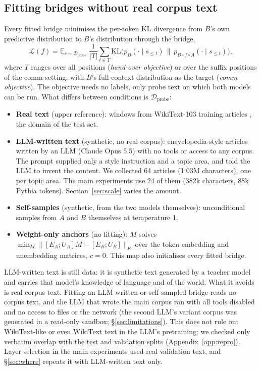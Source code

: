 \subsection{Fitting bridges without real corpus text}
Every fitted bridge minimises the per-token KL divergence from $B$'s own predictive distribution to $B$'s distribution through the bridge,
\begin{equation}
\mathcal{L}(f) = \mathbb{E}_{s\sim\mathcal{D}_{\text{probe}}}\;\frac{1}{|T|}\sum_{t\in T}\mathrm{KL}\big(p_B(\cdot\mid s_{\le t})\,\big\|\,p_{B\circ f\circ A}(\cdot\mid s_{\le t})\big),
\end{equation}
where $T$ ranges over all positions (\emph{hand-over objective}) or over the suffix positions of the comm setting, with $B$'s full-context distribution as the target (\emph{comm objective}). The objective needs no labels, only probe text on which both models can be run. What differs between conditions is $\mathcal{D}_{\text{probe}}$:
\begin{itemize}
\item \textbf{Real text} (upper reference): windows from WikiText-103 training articles \citep{merity2016wikitext}, the domain of the test set.
\item \textbf{LLM-written text} (synthetic, no real corpus): encyclopedia-style articles written by an LLM (Claude Opus 5.5) with no tools or access to any corpus. The prompt supplied only a style instruction and a topic area, and told the LLM to invent the content. We collected 64 articles (1.03M characters), one per topic area. The main experiments use 24 of them (382k characters, 88k Pythia tokens). Section~\ref{sec:scale} varies the amount.
\item \textbf{Self-samples} (synthetic, from the two models themselves): unconditional samples from $A$ and $B$ themselves at temperature 1.
\item \textbf{Weight-only anchors} (no fitting): $M$ solves $\min_M \lVert [E_A;U_A]M - [E_B;U_B]\rVert_F$ over the token embedding and unembedding matrices, $c=0$. This map also initialises every fitted bridge.
\end{itemize}
LLM-written text is still data: it is synthetic text generated by a teacher model and carries that model's knowledge of language and of the world. What it avoids is real corpus text. Fitting an LLM-written or self-sampled bridge reads no corpus text, and the LLM that wrote the main corpus ran with all tools disabled and no access to files or the network (the second LLM's variant corpus was generated in a read-only sandbox; \S\ref{sec:limitations}). This does not rule out WikiText-like or even WikiText text in the LLM's pretraining; we checked only verbatim overlap with the test and validation splits (Appendix~\ref{app:repro}). Layer selection in the main experiments used real validation text, and \S\ref{sec:where} repeats it with LLM-written text only.

